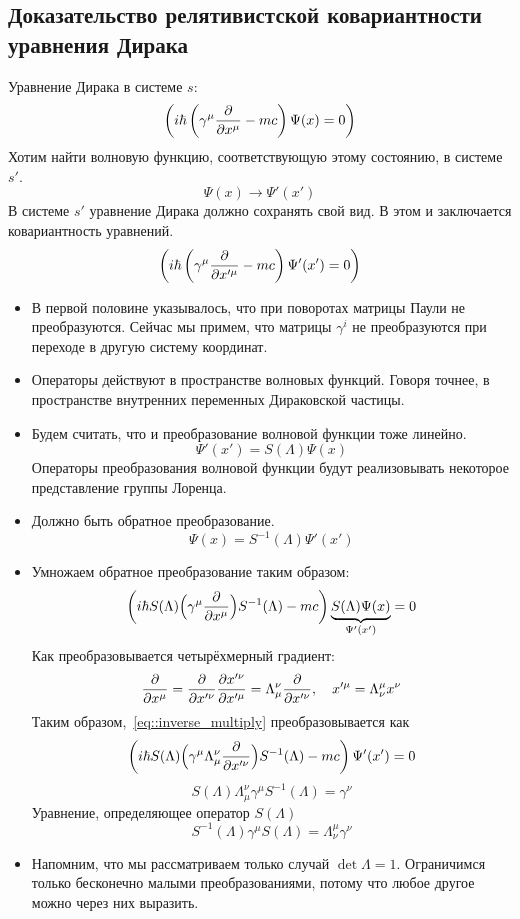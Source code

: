 \subsection{Доказательство релятивистской ковариантности уравнения Дирака}
Уравнение Дирака в системе $s$:
$$
    \left(
        i \hbar \left(
            \gamma^{\mu} \dfrac{\partial }{\partial x^{\mu}} - mc
        \right) \Psi(x) = 0
    \right)
$$
Хотим найти волновую функцию, соответствующую этому состоянию, в системе $s'$.
$$
    \Psi(x) \to \Psi'(x')
$$
В системе $s'$ уравнение Дирака должно сохранять свой вид. В этом и заключается ковариантность уравнений.
$$
    \left(
        i \hbar \left(
            \gamma^{\mu} \dfrac{\partial }{\partial x'^{\mu}} - mc
        \right) \Psi'(x') = 0
    \right)
$$
\begin{itemize}
  \item В первой половине указывалось, что при поворотах матрицы Паули не преобразуются. Сейчас мы примем, что матрицы $\gamma^{i}$ не преобразуются при переходе в другую систему координат.
  \item Операторы действуют в пространстве волновых функций. Говоря точнее, в пространстве внутренних переменных Дираковской частицы. 
  \item Будем считать, что и преобразование волновой функции тоже линейно.
  $$
    \Psi'(x') = S(\Lambda)\Psi(x)
  $$
  Операторы преобразования волновой функции будут реализовывать некоторое представление группы Лоренца.
  \item Должно быть обратное преобразование.
  $$
    \Psi(x) = S^{-1} (\Lambda) \Psi'(x')
  $$
  \item Умножаем обратное преобразование таким образом:
  \begin{equation}
    \left(
        i \hbar S(\Lambda) \Big(
            \gamma^\mu \dfrac{\partial }{\partial x^\mu}
        \Big) S^{-1} (\Lambda) - mc
    \right) \underbrace{S(\Lambda) \Psi(x)}_{\Psi'(x')} = 0
    \label{eq::inverse_multiply}  
  \end{equation}
  Как преобразовывается четырёхмерный градиент:
  $$
    \dfrac{\partial }{\partial x^\mu} = \dfrac{\partial }{\partial x'^\nu} \dfrac{\partial x'^{\nu}}{\partial x'^{\mu}} = \Lambda_\mu^{\nu} \dfrac{\partial }{\partial x'^{\nu}}, \quad x'^{\mu} = \Lambda_\nu^{\mu} x^{\nu}
  $$
  Таким образом,~\eqref{eq::inverse_multiply} преобразовывается как
  $$
    \left(
        i \hbar S(\Lambda) \Big(
            \gamma^\mu \Lambda^{\nu}_{\mu} \dfrac{\partial }{\partial x'^{\nu}}
        \Big) S^{-1} (\Lambda) - mc
    \right) \Psi'(x') = 0
  $$
  $$
    S(\Lambda) \Lambda_\mu^{\nu} \gamma^\mu S^{-1}(\Lambda) = \gamma^{\nu}
  $$
  Уравнение, определяющее оператор $S(\Lambda)$
  $$
    \boxed{
        S^{-1} (\Lambda) \gamma^\mu S(\Lambda) = \Lambda_\nu^{\mu} \gamma^\nu
    }
  $$
  \item Напомним, что мы рассматриваем только случай $\det \Lambda = 1$. Ограничимся только бесконечно малыми преобразованиями, потому что любое другое можно через них выразить.
  

\end{itemize}
